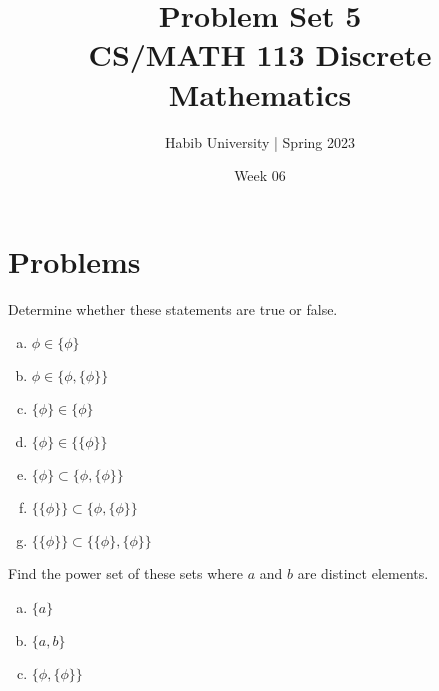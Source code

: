 \documentclass{article}
\newenvironment{problem}[2][Problem]{\begin{trivlist}
\item[\hskip \labelsep {\bfseries #1}\hskip \labelsep {\bfseries #2.}]}{\end{trivlist}}
\begin{document}
\title{Problem Set 5\\CS/MATH 113 Discrete Mathematics}
\author{Habib University | Spring 2023}
\date{Week 06}
\maketitle

\section{Problems}

\begin{problem}{1}[Chapter 2.1, Question 12]
Determine whether these statements are true or false.
\begin{enumerate}[(a)]
    \item $ \phi \in \{\phi\}$
    \item $ \phi \in \{ \phi,\{\phi\} \}$
    \item $ \{ \phi \} \in \{ \phi \} $
    \item $ \{ \phi \} \in \{\{ \phi \}\} $
    \item $ \{ \phi \} \subset \{ \phi, \{\phi \} \} $
    \item $ \{ \{ \phi \} \} \subset \{ \phi, \{ \phi \}\} $
    \item $ \{ \{ \phi \} \} \subset \{ \{\phi \}, \{ \phi \}\} $
\end{enumerate}
\end{problem}

\begin{problem}{2}[Chapter 2.1, Question 23]
Find the power set of these sets where $a$ and $b$ are distinct elements.
\begin{enumerate}[(a)]
    \item $\{a\}$
    \item $\{a,b\}$
    \item $\{ \phi, \{ \phi \}\}$
\end{enumerate}
\end{problem}
\end{document}
